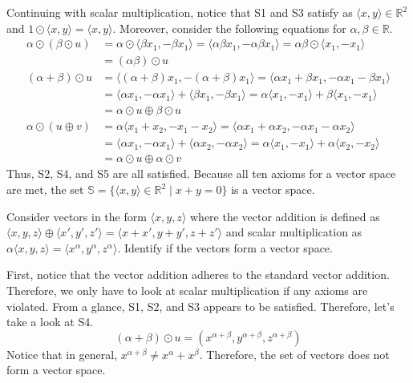\documentclass[../main.tex]{subfiles}
\begin{document}
\begin{solution}
Continuing with scalar multiplication, notice that S1 and S3 satisfy
as $\langle x, y \rangle \in \mathbb{R}^2$ and $1 \odot \langle x, y
\rangle = \langle x, y \rangle$. Moreover, consider the following
equations for $\alpha, \beta \in \mathbb{R}$.
\begin{align*}
    \alpha \odot (\beta \odot u)
    &= \alpha \odot \langle \beta x_1, -\beta x_1 \rangle
    = \langle \alpha\beta x_1, -\alpha\beta x_1 \rangle
    = \alpha\beta \odot \langle x_1, -x_1 \rangle \\
    &= (\alpha\beta) \odot u \\
    (\alpha + \beta) \odot u
    &= \langle (\alpha + \beta) x_1, -(\alpha + \beta) x_1 \rangle
    = \langle \alpha x_1 + \beta x_1,
        -\alpha x_1 - \beta x_1 \rangle \\
    &= \langle \alpha x_1, -\alpha x_1 \rangle +
        \langle \beta x_1, -\beta x_1 \rangle
    = \alpha \langle x_1, -x_1 \rangle +
        \beta \langle x_1, -x_1 \rangle \\
    &= \alpha \odot u \oplus \beta \odot u \\
    \alpha \odot (u \oplus v)
    &= \alpha \langle x_1 + x_2, -x_1 - x_2 \rangle
    = \langle \alpha x_1 + \alpha x_2,
        -\alpha x_1 - \alpha x_2 \rangle \\
    &= \langle \alpha x_1, -\alpha x_1 \rangle +
        \langle \alpha x_2, -\alpha x_2 \rangle
    = \alpha \langle x_1, -x_1 \rangle +
        \alpha \langle x_2, -x_2 \rangle \\
    &= \alpha \odot u \oplus \alpha \odot v
\end{align*}
Thus, S2, S4, and S5 are all satisfied. Because all ten axioms for
a vector space are met, the set $\mathbb{S} = \{ \langle x, y \rangle
\in \mathbb{R}^2 \mid x + y = 0 \}$ is a vector space.
\end{solution}

\begin{problem}{}{}
Consider vectors in the form $\langle x, y, z \rangle$ where the
vector addition is defined as $\langle x, y, z \rangle \oplus
\langle x', y', z' \rangle = \langle x + x', y + y', z + z' \rangle$
and scalar multiplication as $\alpha \langle x, y, z \rangle =
\langle x^\alpha, y^\alpha, z^\alpha \rangle$. Identify if the vectors
form a vector space.
\end{problem}
\begin{solution}
First, notice that the vector addition adheres to the standard vector
addition. Therefore, we only have to look at scalar multiplication
if any axioms are violated. From a glance, S1, S2, and S3 appears to
be satisfied. Therefore, let's take a look at S4.
\[
(\alpha + \beta) \odot u
= \left(
    x^{\alpha + \beta}, y^{\alpha + \beta}, z^{\alpha + \beta}
\right)
\]
Notice that in general, $x^{\alpha + \beta} \neq x^\alpha + x^\beta$.
Therefore, the set of vectors does not form a vector space.
\end{solution}
\end{document}
